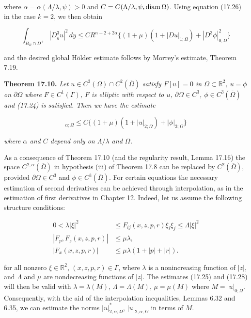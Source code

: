 where $\alpha=\alpha(\Lambda/\lambda,\psi)>0$ and $C=C(\Lambda/\lambda,\psi,\operatorname{diam}\Omega)$. Using equation (17.26) in the case $k=2$, we then obtain

\begin{equation}
\int_{B_R\cap D^+} \left|D_y^3u\right|^2\,dy \le CR^{n-2+2\alpha}\{(1+\mu)(1+|Du|_{1;\Omega})+|D^3\phi|_{0;\Omega}^2\}
\tag{17.27}
\end{equation}

and the desired global H\"older estimate follows by Morrey's estimate, Theorem 7.19.

\textbf{Theorem 17.10.} \textit{Let $u\in C^3(\Omega)\cap C^2(\overline{\Omega})$ satisfy $F[u]=0$ in $\Omega\subset \mathbb{R}^2$, $u=\phi$ on $\partial\Omega$ where $F\in C^1(\Gamma)$, $F$ is elliptic with respect to $u$, $\partial\Omega\in C^3$, $\phi\in C^3(\overline{\Omega})$ and (17.24) is satisfied. Then we have the estimate}

\begin{equation}
[D^2u]_{\alpha;\Omega}\le C\{(1+\mu)(1+|u|_{2;\Omega})+|\phi|_{3;\Omega}\}
\tag{17.28}
\end{equation}

\textit{where $\alpha$ and $C$ depend only on $\Lambda/\lambda$ and $\Omega$.}

As a consequence of Theorem 17.10 (and the regularity result, Lemma 17.16) the space $C^{2,\alpha}(\overline{\Omega})$ in hypothesis (iii) of Theorem 17.8 can be replaced by $C^2(\overline{\Omega})$, provided $\partial\Omega\in C^3$ and $\phi\in C^3(\overline{\Omega})$. For certain equations the necessary estimation of second derivatives can be achieved through interpolation, as in the estimation of first derivatives in Chapter 12. Indeed, let us assume the following structure conditions:

\begin{equation}
\begin{aligned}
0<\lambda|\xi|^2 &\le F_{ij}(x,z,p,r)\xi_i\xi_j \le \Lambda|\xi|^2 \\
\left|F_p,F_z(x,z,p,r)\right| &\le \mu\lambda, \\
\left|F_x(x,z,p,r)\right| &\le \mu\lambda(1+|p|+|r|).
\end{aligned}
\tag{17.29}
\end{equation}

for all nonzero $\xi\in\mathbb{R}^2$, $(x,z,p,r)\in\Gamma$, where $\lambda$ is a nonincreasing function of $|z|$, and $\Lambda$ and $\mu$ are nondecreasing functions of $|z|$. The estimates (17.25) and (17.28) will then be valid with $\lambda=\lambda(M)$, $\Lambda=\Lambda(M)$, $\mu=\mu(M)$ where $M=|u|_{0;\Omega}$. Consequently, with the aid of the interpolation inequalities, Lemmas 6.32 and 6.35, we can estimate the norms $|u|_{2,\alpha;\Omega}^*$, $|u|_{2,\alpha;\Omega}$ in terms of $M$.


